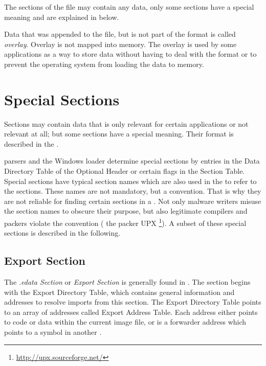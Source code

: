 The sections of the \PE{} file may contain any data, only some sections have a special meaning and are explained in \emph{} below. %

Data that was appended to the file, but is not part of the \PE{} format is called \emph{overlay}. Overlay is not mapped into memory. The overlay is used by some applications as a way to store data without having to deal with the \PE{} format or to prevent the operating system from loading the data to memory. 

\section{Special Sections} \label{sec:specialsections}

Sections may contain data that is only relevant for certain applications or not relevant at all; but some sections have a special meaning. Their format is described in the \PECOFF{} \cite[]{pespec}. 

\PE{} parsers and the Windows loader determine special sections by entries in the Data Directory Table of the Optional Header or certain flags in the Section Table. Special sections have typical section names which are also used in the \PECOFF{} to refer to the sections. These names are not mandatory, but a convention. That is why they are not reliable for finding certain sections in a \PE{}. Not only malware writers misuse the section names to obscure their purpose, but also legitimate compilers and packers violate the convention (\eg{} the packer UPX \footnote{\url{http://upx.sourceforge.net/}}). A subset of these special sections is described in the following.

\subsection*{Export Section} \label{subsec:idata}

The \emph{.edata Section} or \emph{Export Section} is generally found in . The section begins with the Export Directory Table, which contains general information and addresses to resolve imports from this section. The Export Directory Table points to an array of addresses called Export Address Table. Each address either points to code or data within the current image file, or is a forwarder address which points to a symbol in another \DLL{}. 


